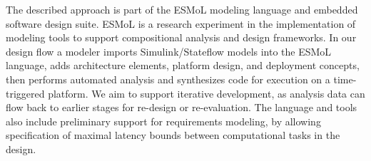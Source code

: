 The described approach is part of the ESMoL modeling language and embedded software design 
suite\cite{modeling:aces08}.  ESMoL is a research experiment in the implementation of modeling 
tools to support compositional analysis and design frameworks.  In our design flow a modeler 
imports Simulink/Stateflow models \cite{tools:mathworks} into the ESMoL language, adds architecture 
elements, platform design, and deployment concepts, then performs automated analysis and synthesizes 
code for execution on a time-triggered platform\cite{timed:tta}.  We aim to support iterative development, 
as analysis data can flow back to earlier stages for re-design or re-evaluation.  The language and tools 
also include preliminary support for requirements modeling, by allowing specification of maximal latency 
bounds between computational tasks in the design.
